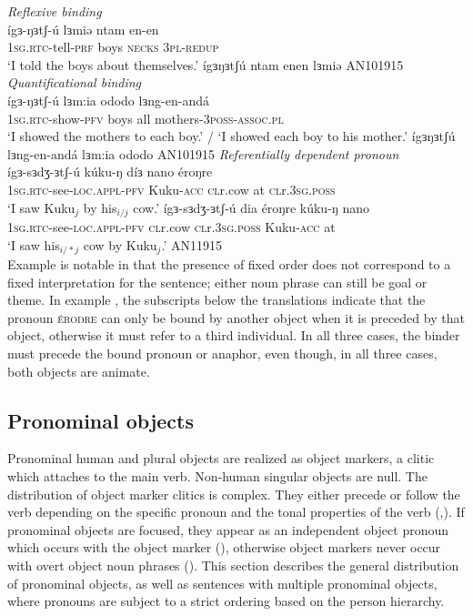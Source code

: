 \ea \textit{Reflexive binding}\\ \label{ch12:ex:reflobj}
\ea \gll ígɜ-ŋɜtʃ-ú lɜmiə ntam en-en	\\
\textsc{1sg.rtc}-tell-\textsc{prf} boys \textsc{necks} \textsc{3pl-redup}\\			
\glt `I told the boys about themselves.'
\ex *ígɜŋɜtʃú ntam enen lɜmiə  \hfill AN101915
\z 
\ex \textit{Quantificational binding}\\ \label{ch12:ex:qobj}
\ea \gll ígɜ-ŋɜtʃ-ú lɜm:ia ododo lɜng-en-andá		\\	
\textsc{1sg.rtc}-show-\textsc{pfv} boys all mothers-\textsc{3poss}-\textsc{assoc.pl} \\
\glt `I showed the mothers to each boy.' /
`I showed each boy to his mother.'
\ex *ígɜŋɜtʃú lɜng-en-andá lɜm:ia ododo  \hfill AN101915
\z 
\ex \textit{Referentially dependent pronoun} \label{ch12:ex:rex}\\
	\ea \gll ígɜ-sɜdʒ-ɜtʃ-ú kúku-ŋ díɜ nano éroŋre	\\
\textsc{1sg.rtc}-see-\textsc{loc.appl}-\textsc{pfv} Kuku-\textsc{acc} \textsc{cl}r.cow at \textsc{cl}r.\textsc{3sg.poss} \\
	\glt 	`I saw Kuku$_{j}$ by his$_{i/j}$ cow.'
\ex \gll  ígɜ-sɜdʒ-ɜtʃ-ú dia éroŋre kúku-ŋ nano \\
	\textsc{1sg.rtc}-see-\textsc{loc.appl}-\textsc{pfv} \textsc{cl}r.cow \textsc{cl}r.\textsc{3sg.poss} Kuku-\textsc{acc} at  \\
	\glt `I saw his$_{i/*j}$ cow by Kuku$_{j}$.' \hfill AN11915\\
	\z 
\z 
Example  is notable in that the presence of fixed order does not correspond to a fixed interpretation for the sentence; either noun phrase can still be goal or theme. In example , the subscripts below the translations indicate that the pronoun \textsc{éroŋre} can only be bound by another object when it is preceded by that object, otherwise it must refer to a third individual. In all three cases, the binder must precede the bound pronoun or anaphor, even though, in all three cases, both objects are animate. 

\subsection{Pronominal objects}\label{sec:ch12:pronoun}

Pronominal human and plural objects are realized as object markers, a clitic which attaches to the main verb. Non-human singular objects are null. The distribution of object marker clitics is complex. They either precede or follow the verb depending on the specific pronoun and the tonal properties of the verb (,). If pronominal objects are focused, they appear as an independent object pronoun which occurs with the object marker (), otherwise object markers never occur with overt object noun phrases (). This section describes the general distribution of pronominal objects, as well as sentences with multiple pronominal objects, where pronouns are subject to a strict ordering based on the person hierarchy.


